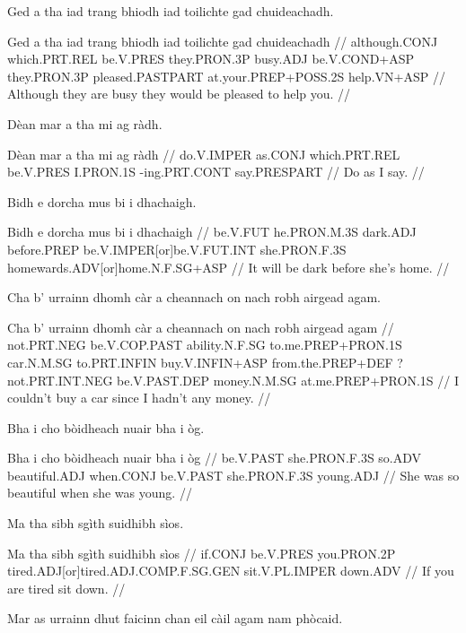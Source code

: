 \documentclass[a4paper,10pt]{article}
\begin{document}
\ex
\begingl
\glpre Ged a tha iad trang bhiodh iad toilichte gad chuideachadh. 

\vspace{4mm}
\gla Ged a tha iad trang bhiodh iad toilichte gad chuideachadh  //
\glb although.CONJ which.PRT.REL be.V.PRES they.PRON.3P busy.ADJ be.V.COND+ASP they.PRON.3P pleased.PASTPART at.your.PREP+POSS.2S help.VN+ASP  //
\glft Although they are busy they would be pleased to help you. //
\endgl
\xe

\ex
\begingl
\glpre Dèan mar a tha mi ag ràdh. 

\vspace{4mm}
\gla Dèan mar a tha mi ag ràdh  //
\glb do.V.IMPER as.CONJ which.PRT.REL be.V.PRES I.PRON.1S -ing.PRT.CONT say.PRESPART  //
\glft Do as I say. //
\endgl
\xe

\ex
\begingl
\glpre Bidh e dorcha mus bi i dhachaigh. 

\vspace{4mm}
\gla Bidh e dorcha mus bi i dhachaigh  //
\glb be.V.FUT he.PRON.M.3S dark.ADJ before.PREP be.V.IMPER[or]be.V.FUT.INT she.PRON.F.3S homewards.ADV[or]home.N.F.SG+ASP  //
\glft It will be dark before she's home. //
\endgl
\xe

\ex
\begingl
\glpre Cha b' urrainn dhomh càr a cheannach on nach robh airgead agam. 

\vspace{4mm}
\gla Cha b' urrainn dhomh càr a cheannach on nach robh airgead agam  //
\glb not.PRT.NEG be.V.COP.PAST ability.N.F.SG to.me.PREP+PRON.1S car.N.M.SG to.PRT.INFIN buy.V.INFIN+ASP from.the.PREP+DEF ?not.PRT.INT.NEG be.V.PAST.DEP money.N.M.SG at.me.PREP+PRON.1S  //
\glft I couldn't buy a car since I hadn't any money. //
\endgl
\xe

\ex
\begingl
\glpre Bha i cho bòidheach nuair bha i òg. 

\vspace{4mm}
\gla Bha i cho bòidheach nuair bha i òg  //
\glb be.V.PAST she.PRON.F.3S so.ADV beautiful.ADJ when.CONJ be.V.PAST she.PRON.F.3S young.ADJ  //
\glft She was so beautiful when she was young. //
\endgl
\xe

\ex
\begingl
\glpre Ma tha sibh sgìth suidhibh sìos. 

\vspace{4mm}
\gla Ma tha sibh sgìth suidhibh sìos  //
\glb if.CONJ be.V.PRES you.PRON.2P tired.ADJ[or]tired.ADJ.COMP.F.SG.GEN sit.V.PL.IMPER down.ADV  //
\glft If you are tired sit down. //
\endgl
\xe

\ex
\begingl
\glpre Mar as urrainn dhut faicinn chan eil càil agam nam phòcaid. 
\end{document}
